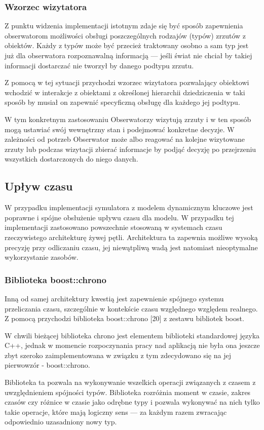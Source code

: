 {{\subsubsection{Wzorzec wizytatora}
\par{
Z punktu widzenia implementacji istotnym zdaje się być sposób zapewnienia obserwatorom możliwości obsługi poszczególnych rodzajów (typów) zrzutów z obiektów. Każdy z typów może być przecież traktowany osobno a sam typ jest już dla obserwatora rozpoznawalną informacją --- jeśli świat nie chciał by takiej informacji dostarczać nie tworzył by danego podtypu zrzutu.
}
\par{
Z pomocą w tej sytuacji przychodzi wzorzec wizytatora pozwalający obiektowi wchodzić w interakcje z obiektami z określonej hierarchii dziedziczenia w taki sposób by musiał on zapewnić specyficzną obsługę dla każdego jej podtypu.
}
\par{
W tym konkretnym zastosowaniu Obserwatorzy wizytują zrzuty i w ten sposób mogą ustawiać swój wewnętrzny stan i podejmować konkretne decyzje. W zależności od potrzeb Obserwator może albo reagować na kolejne wizytowane zrzuty lub podczas wizytacji zbierać informacje by podjąć decyzję po przejrzeniu wszystkich dostarczonych do niego danych.
}

\subsection{Upływ czasu}
\par{
W przypadku implementacji symulatora z modelem dynamicznym kluczowe jest poprawne i spójne obsłużenie upływu czasu dla modelu. W przypadku tej implementacji zastosowano powszechnie stosowaną w systemach czasu rzeczywistego architekturę żywej pętli. Architektura ta zapewnia możliwe wysoką precyzję przy odliczaniu czasu, jej niewątpliwą wadą jest natomiast nieoptymalne wykorzystanie zasobów.
}
\subsubsection{Biblioteka boost::chrono}
\par{
Inną od samej architektury kwestią jest zapewnienie spójnego systemu przeliczania czasu, szczególnie w kontekście czasu względnego względem realnego. Z pomocą przychodzi biblioteka boost::chrono [20] z zestawu bibliotek boost.
\par{
W chwili bieżącej biblioteka chrono jest elementem biblioteki standardowej języka C++, jednak w momencie rozpoczynania pracy nad aplikacją nie była ona jeszcze zbyt szeroko zaimplementowana w związku z tym zdecydowano się na jej pierwowzór - boost::chrono.
}
\par{
Biblioteka ta pozwala na wykonywanie wszelkich operacji związanych z czasem z uwzględnieniem spójności typów. Biblioteka rozróżnia moment w czasie, zakres czasów czy różnice w czasie jako odrębne typy i pozwala wykonywać na nich tylko takie operacje, które mają logiczny sens --- za każdym razem zwracając odpowiednio uzasadniony nowy typ.
}
}}}
